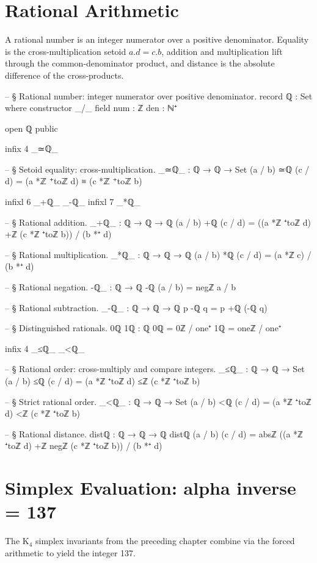 \documentclass[11pt,a4paper]{book}
\def\alpha{alpha}%
\def\cdot{.}%
\def\texorpdfstring#1#2{#2}%
\begin{document}
\section{Rational Arithmetic}

A rational number is an integer numerator over a positive denominator.
Equality is the cross-multiplication setoid $a \cdot d = c \cdot b$, addition and multiplication lift through the common-denominator product, and distance is the absolute difference of the cross-products.

\begin{code}
-- § Rational number: integer numerator over positive denominator.
record ℚ : Set where
  constructor _/_
  field
    num : ℤ
    den : ℕ⁺

open ℚ public

infix 4 _≃ℚ_

-- § Setoid equality: cross-multiplication.
_≃ℚ_ : ℚ → ℚ → Set
(a / b) ≃ℚ (c / d) = (a *ℤ ⁺toℤ d) ≡ (c *ℤ ⁺toℤ b)

infixl 6 _+ℚ_ _-ℚ_
infixl 7 _*ℚ_

-- § Rational addition.
_+ℚ_ : ℚ → ℚ → ℚ
(a / b) +ℚ (c / d) = ((a *ℤ ⁺toℤ d) +ℤ (c *ℤ ⁺toℤ b)) / (b *⁺ d)

-- § Rational multiplication.
_*ℚ_ : ℚ → ℚ → ℚ
(a / b) *ℚ (c / d) = (a *ℤ c) / (b *⁺ d)

-- § Rational negation.
-ℚ_ : ℚ → ℚ
-ℚ (a / b) = negℤ a / b

-- § Rational subtraction.
_-ℚ_ : ℚ → ℚ → ℚ
p -ℚ q = p +ℚ (-ℚ q)

-- § Distinguished rationals.
0ℚ 1ℚ : ℚ
0ℚ = 0ℤ / one⁺
1ℚ = oneℤ / one⁺

infix 4 _≤ℚ_ _<ℚ_

-- § Rational order: cross-multiply and compare integers.
_≤ℚ_ : ℚ → ℚ → Set
(a / b) ≤ℚ (c / d) = (a *ℤ ⁺toℤ d) ≤ℤ (c *ℤ ⁺toℤ b)

-- § Strict rational order.
_<ℚ_ : ℚ → ℚ → Set
(a / b) <ℚ (c / d) = (a *ℤ ⁺toℤ d) <ℤ (c *ℤ ⁺toℤ b)

-- § Rational distance.
distℚ : ℚ → ℚ → ℚ
distℚ (a / b) (c / d) = absℤ ((a *ℤ ⁺toℤ d) +ℤ negℤ (c *ℤ ⁺toℤ b)) / (b *⁺ d)
\end{code}

\section{Simplex Evaluation: \texorpdfstring{$\alpha^{-1} = 137$}{alpha inverse = 137}}

The K$_4$ simplex invariants from the preceding chapter combine via the forced
arithmetic to yield the integer 137.
\end{document}
